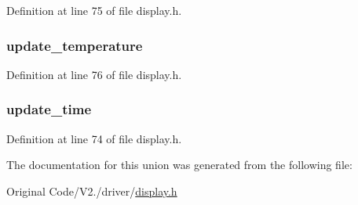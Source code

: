 \-Definition at line 75 of file display.\-h.

\hypertarget{unions__display__flags_a49b58805245fc6fb2a9dd89ab9a41ef4}{
\subsubsection[{update\-\_\-temperature}]{ {\bf update\-\_\-temperature}}}\label{unions__display__flags_a49b58805245fc6fb2a9dd89ab9a41ef4}


\-Definition at line 76 of file display.\-h.

\hypertarget{unions__display__flags_a0fe35dbb92aa1da6230872d35273a99b}{
\subsubsection[{update\-\_\-time}]{ {\bf update\-\_\-time}}}\label{unions__display__flags_a0fe35dbb92aa1da6230872d35273a99b}


\-Definition at line 74 of file display.\-h.



\-The documentation for this union was generated from the following file\-:\begin{DoxyCompactItemize}
\item 
\-Original Code/\-V2./driver/\hyperlink{display_8h}{display.\-h}\end{DoxyCompactItemize}
